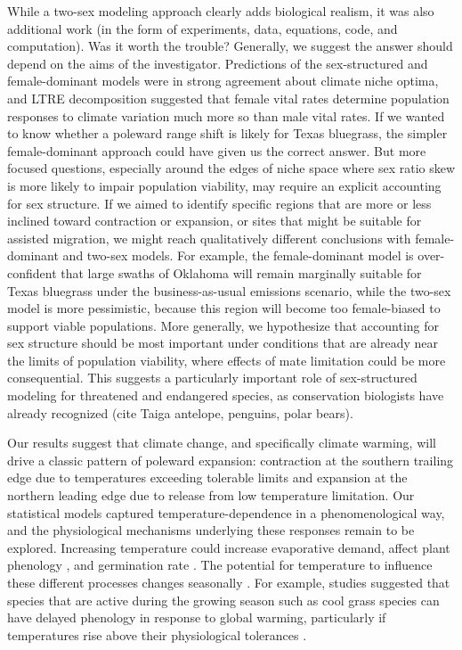 \documentclass[12pt]{article}\usepackage[]{graphicx}\usepackage[dvipsnames]{xcolor}
\begin{document}
While a two-sex modeling approach clearly adds biological realism, it was also additional work (in the form of experiments, data, equations, code, and computation). 
Was it worth the trouble? 
Generally, we suggest the answer should depend on the aims of the investigator. 
Predictions of the sex-structured and female-dominant models were in strong agreement about climate niche optima, and LTRE decomposition suggested that female vital rates determine population responses to climate variation much more so than male vital rates. 
If we wanted to know whether a poleward range shift is likely for Texas bluegrass, the simpler female-dominant approach could have given us the correct answer. 
But more focused questions, especially around the edges of niche space where sex ratio skew is more likely to impair population viability, may require an explicit accounting for sex structure. 
If we aimed to identify specific regions that are more or less inclined toward contraction or expansion, or sites that might be suitable for assisted migration, we might reach qualitatively different conclusions with female-dominant and two-sex models. 
For example, the female-dominant model is over-confident that large swaths of Oklahoma will remain marginally suitable for Texas bluegrass under the business-as-usual emissions scenario, while the two-sex model is more pessimistic, because this region will become too female-biased to support viable populations. 
More generally, we hypothesize that accounting for sex structure should be most important under conditions that are already near the limits of population viability, where effects of mate limitation could be more consequential. 
This suggests a particularly important role of sex-structured modeling for threatened and endangered species, as conservation biologists have already recognized (cite Taiga antelope, penguins, polar bears). 

Our results suggest that climate change, and specifically climate warming, will drive a classic pattern of poleward expansion: contraction at the southern trailing edge due to temperatures exceeding tolerable limits and expansion at the northern leading edge due to release from low temperature limitation. 
Our statistical models captured temperature-dependence in a phenomenological way, and the physiological mechanisms underlying these responses remain to be explored. 
Increasing temperature could increase evaporative demand, affect plant phenology \citep{mclean2016predicting,sherry2007divergence,iler2019reproductive}, and germination rate \citep{reed2021climate}.
The potential for temperature to influence these different processes changes seasonally \citep{konapala2020climate}.
For example, studies suggested that species that are active during the growing season such as cool grass species can have delayed phenology in response to global warming, particularly if temperatures rise above their physiological tolerances \citep{cleland2007shifting, williams2015life}.
\end{document}
